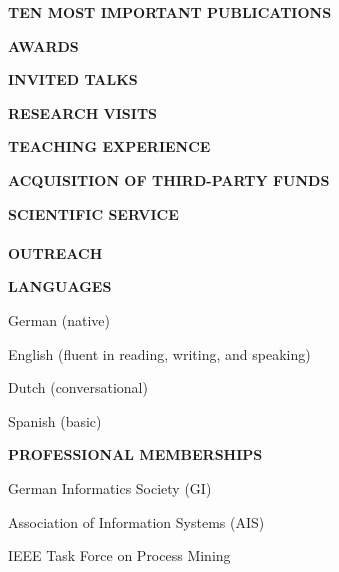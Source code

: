 \documentclass[titlepage]{article}
\newenvironment{itemize*}%
  {\begin{itemize}%
    \setlength{\itemsep}{0pt}%
    \setlength{\parskip}{0pt}}%
  {\end{itemize}}
\newcommand{\heading}[1] {
\vspace*{0.7cm}\noindent \textcolor{myred}{\large{\textbf{\uppercase{{#1}}}}} \\[-5pt]
\noindent\makebox[\linewidth]{\rule{\textwidth}{0.4pt}\vspace*{0.2cm}}
}
\newcommand{\subheading}[1] {\vspace*{0.5cm}\noindent \uppercase{\textbf{#1}}}
\begin{document}
\heading{Ten Most Important Publications}


\heading{Awards}



\heading{Invited Talks}



\heading{Research Visits}


\heading{Teaching Experience}



%

\heading{Acquisition of Third-Party Funds}



\heading{Scientific Service} \\


\heading{Outreach}


\heading{Languages}
\begin{itemize*}
\item  German (native)
\item English (fluent in reading, writing, and speaking)
\item Dutch (conversational)
\item Spanish (basic)
\end{itemize*}

\heading{Professional Memberships}
\begin{itemize*}
\item German Informatics Society (GI)
\item Association of Information Systems (AIS)
\item IEEE Task Force on Process Mining
\end{itemize*}
\end{document}
